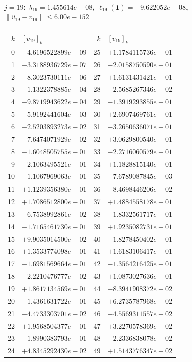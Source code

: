\documentclass[11pt]{article}
\begin{document}
\paragraph{$j = 19$: $\lambda_{19} = 1.455614e-08$, \quad $\ell_{19}(\mathbf{1}) = -9.622052e-08$, \quad $\|\hat v_{19} - v_{19}\| \leq 6.00e-152$}
\begin{center}
{\footnotesize
\begin{tabular}{r@{\;\;}l@{\quad}r@{\;\;}l}
\toprule
$k$ & $[v_{19}]_k$ & $k$ & $[v_{19}]_k$ \\
\midrule
0 & $-4.6196522899e-09$ & 25 & $+1.1784115736e-01$ \\
1 & $-3.3188936729e-07$ & 26 & $-2.0158750590e-01$ \\
2 & $-8.3023730111e-06$ & 27 & $+1.6131431421e-01$ \\
3 & $-1.1322378885e-04$ & 28 & $-2.5685267346e-02$ \\
4 & $-9.8719943622e-04$ & 29 & $-1.3919293855e-01$ \\
5 & $-5.9192441604e-03$ & 30 & $+2.6907469761e-01$ \\
6 & $-2.5203893273e-02$ & 31 & $-3.2650636071e-01$ \\
7 & $-7.6474071929e-02$ & 32 & $+3.0629800540e-01$ \\
8 & $-1.6048505755e-01$ & 33 & $-2.2716060579e-01$ \\
9 & $-2.1063495521e-01$ & 34 & $+1.1828815140e-01$ \\
10 & $-1.1067969063e-01$ & 35 & $-7.6789087845e-03$ \\
11 & $+1.1239356380e-01$ & 36 & $-8.4698446206e-02$ \\
12 & $+1.7086512800e-01$ & 37 & $+1.4884558178e-01$ \\
13 & $-6.7538992861e-02$ & 38 & $-1.8332561717e-01$ \\
14 & $-1.7165461730e-01$ & 39 & $+1.9235082731e-01$ \\
15 & $+9.9035014500e-02$ & 40 & $-1.8278450402e-01$ \\
16 & $+1.3533774098e-01$ & 41 & $+1.6183106417e-01$ \\
17 & $-1.6981569664e-01$ & 42 & $-1.3564216425e-01$ \\
18 & $-2.2210476777e-02$ & 43 & $+1.0873027636e-01$ \\
19 & $+1.8617134569e-01$ & 44 & $-8.3941908372e-02$ \\
20 & $-1.4361631722e-01$ & 45 & $+6.2735787968e-02$ \\
21 & $-4.4733303701e-02$ & 46 & $-4.5569311557e-02$ \\
22 & $+1.9568504377e-01$ & 47 & $+3.2270578369e-02$ \\
23 & $-1.8990383793e-01$ & 48 & $-2.2336838078e-02$ \\
24 & $+4.8345292430e-02$ & 49 & $+1.5143776347e-02$ \\
\bottomrule
\end{tabular}
}
\end{center}
\end{document}

